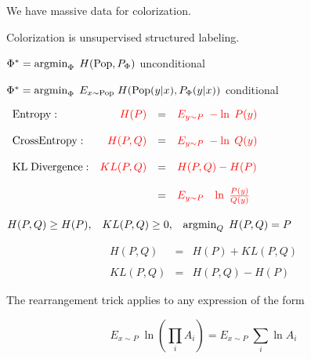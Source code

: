 {{\vfill
We have massive data for colorization.

\vfill
Colorization is unsupervised structured labeling.
}


{\color{red} $\Phi^* = \operatorname*{argmin}_\Phi\;H(\mathrm{Pop},P_\Phi)$} unconditional

\vfill
{\color{red} $\Phi^* = \operatorname*{argmin}_\Phi\;E_{x \sim \mathrm{Pop}}\;H(\mathrm{Pop}(y|x),P_\Phi(y|x))$} conditional

\vfill
\centerline{
  $\begin{array}{lrcl}
\mathrm{Entropy}: & {\color{red} H(P)} & = & {\color{red} E_{y \sim P}\;-\ln\;P(y)} \\
\\
\mathrm{Cross Entropy:} & {\color{red} H(P,Q)} & = & {\color{red} E_{y \sim P}\;-\ln\;Q(y)} \\
\\
\mathrm{KL\; Divergence:} & {\color{red} KL(P,Q)} & = & {\color{red} H(P,Q) - H(P)} \\
\\
& & = & {\color{red} E_{y \sim P}\;\;\; \ln\;\frac{P(y)}{Q(y)}}
\end{array}$}

\vfill
\centerline{{\color{red} $H(P,Q) \geq H(P),\;\;\;KL(P,Q) \geq 0,\;\;\;\operatorname*{argmin}_Q\;H(P,Q) = P$}}




\begin{eqnarray*}
H(P,Q) & = & H(P) + KL(P,Q) \\
\\
KL(P,Q) & = & H(P,Q) - H(P)
\end{eqnarray*}


\vfill
The rearrangement trick applies to any expression of the form

\vfill
$$E_{x \sim P} \;\ln \left(\prod_i A_i\right) = E_{x \sim P} \;\sum_i \ln A_i$$


}

